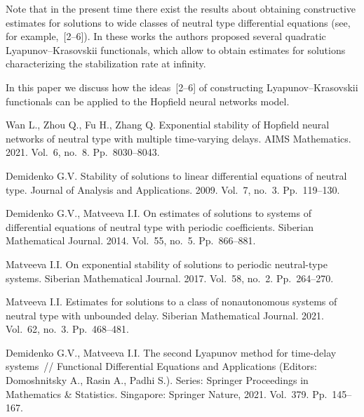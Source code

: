 \documentclass[12pt]{llncs}
\begin{document}
Note that in the present time there exist the results about obtaining constructive estimates for solutions to wide classes of neutral type differential equations (see, for example,~[2--6]).
In these works the authors proposed several quadratic Lyapunov--Krasovskii functionals, which allow to obtain estimates for solutions characterizing the stabilization rate at infinity.

In this paper we discuss how the ideas~[2--6] of constructing Lyapunov--Krasovskii functionals can be applied to the Hopfield neural networks model.



\begin{thebibliography}{9} %

Wan L., Zhou Q., Fu H., Zhang Q.
Exponential stability of Hopfield neural networks of neutral type
with multiple time-varying delays.
AIMS Mathematics.
2021. Vol.~6, no.~8. Pp.~8030--8043.

Demidenko G.V.
Stability of solutions to linear differential equations of neutral type.
Journal of Analysis and Applications.
2009. Vol.~7, no.~3. Pp.~119--130.

Demidenko G.V., Matveeva I.I.
On estimates of solutions to systems of differential equations of neutral
type with periodic coefficients.
Siberian Mathematical Journal.
2014. Vol.~55, no.~5. Pp.~866--881.

Matveeva I.I.
On exponential stability of solutions to periodic neutral-type systems.
Siberian Mathematical Journal.
2017. Vol.~58, no.~2. Pp.~264--270.

Matveeva I.I.
Estimates for solutions to a class of nonautonomous systems
of neutral type with unbounded delay.
Siberian Mathematical Journal.
2021. Vol.~62, no.~3. Pp.~468--481.

Demidenko G.V., Matveeva I.I.
The second Lyapunov method for time-delay systems~//
Functional Differential Equations and Applications
(Editors: Domoshnitsky A., Rasin A., Padhi S.).
Series: Springer Proceedings in Mathematics \& Statistics.
Singapore: Springer Nature, 2021. Vol.~379. Pp.~145--167.

\end{thebibliography}

\end{document}
